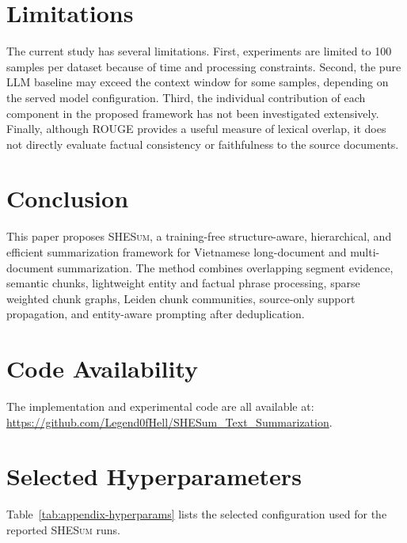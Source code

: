 \documentclass[11pt]{article}
\newcommand{\methodname}{\textsc{SHESum}}
\begin{document}
\section{Limitations}
\label{sec:limitations}

The current study has several limitations. First, experiments are limited to 100 samples per dataset because of time and processing constraints. Second, the pure LLM baseline may exceed the context window for some samples, depending on the served model configuration. Third, the individual contribution of each component in the proposed framework has not been investigated extensively. Finally, although ROUGE provides a useful measure of lexical overlap, it does not directly evaluate factual consistency or faithfulness to the source documents.

\section{Conclusion}
\label{sec:conclusion}

This paper proposes \methodname{}, a training-free structure-aware, hierarchical, and efficient summarization framework for Vietnamese long-document and multi-document summarization. The method combines overlapping segment evidence, semantic chunks, lightweight entity and factual phrase processing, sparse weighted chunk graphs, Leiden chunk communities, source-only support propagation, and entity-aware prompting after deduplication.

\section*{Code Availability}

The implementation and experimental code are all available at: \url{https://github.com/Legend0fHell/SHESum_Text_Summarization}.



\clearpage
\onecolumn
\appendix

\section{Selected Hyperparameters}
\label{app:hyperparameters}

Table~\ref{tab:appendix-hyperparams} lists the selected configuration used for the reported \methodname{} runs.
\end{document}
